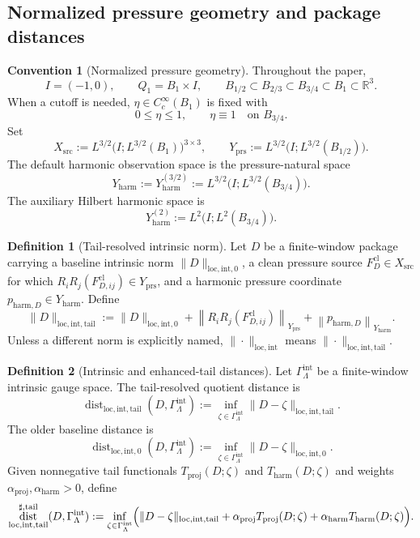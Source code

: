 \documentclass[11pt]{article}
\numberwithin{equation}{section}
\theoremstyle{definition}
\newtheorem{definition}[definition]{Definition}
\newtheorem{convention}[convention]{Convention}
\theoremstyle{remark}
\DeclareMathOperator{\dist}{dist}
\newcommand{\R}{\mathbb{R}}
\newcommand{\loc}{\mathrm{loc}}
\newcommand{\intg}{\mathrm{int}}
\newcommand{\tail}{\mathrm{tail}}
\newcommand{\prs}{\mathrm{prs}}
\newcommand{\proj}{\mathrm{proj}}
\newcommand{\harm}{\mathrm{harm}}
\newcommand{\src}{\mathrm{src}}
\newcommand{\cl}{\mathrm{cl}}
\newcommand{\norm}[2]{\left\|#1\right\|_{#2}}
\newcommand{\Gammaint}{\Gamma^{\intg}_{\Lambda}}
\begin{document}
\subsection{Normalized pressure geometry and package distances}
\label{sec:geometry}

\begin{convention}[Normalized pressure geometry]\label{conv:normalized-geometry}
Throughout the paper,
\[
        I=(-1,0),\qquad Q_1=B_1\times I,
        \qquad B_{1/2}\subset B_{2/3}\subset B_{3/4}\subset B_1\subset\R^3.
\]
When a cutoff is needed, $\eta\in C_c^\infty(B_1)$ is fixed with
\[
        0\le \eta\le 1,\qquad \eta\equiv 1\quad\text{on }B_{3/4}.
\]
Set
\[
        X_{\src}:=L^{3/2}\bigl(I;L^{3/2}(B_1)\bigr)^{3\times3},
        \qquad
        Y_{\prs}:=L^{3/2}\bigl(I;L^{3/2}(B_{1/2})\bigr).
\]
The default harmonic observation space is the pressure-natural space
\[
        Y_{\harm}:=Y^{(3/2)}_{\harm}
        :=L^{3/2}\bigl(I;L^{3/2}(B_{3/4})\bigr).
\]
The auxiliary Hilbert harmonic space is
\[
        Y^{(2)}_{\harm}:=L^2\bigl(I;L^2(B_{3/4})\bigr).
\]
\end{convention}

\begin{definition}[Tail-resolved intrinsic norm]\label{def:tail-resolved-norm}
Let $D$ be a finite-window package carrying a baseline intrinsic norm
$\|D\|_{\loc,\intg,0}$, a clean pressure source $F^{\cl}_{D}\in X_{\src}$ for which
$R_iR_j(F^{\cl}_{D,ij})\in Y_{\prs}$, and a harmonic pressure coordinate
$p_{\harm,D}\in Y_{\harm}$.  Define
\begin{equation}\label{eq:tail-resolved-norm}
\|D\|_{\loc,\intg,\tail}
:=
\|D\|_{\loc,\intg,0}
+
\norm{R_iR_j(F^{\cl}_{D,ij})}{Y_{\prs}}
+
\norm{p_{\harm,D}}{Y_{\harm}}.
\end{equation}
Unless a different norm is explicitly named, $\|\cdot\|_{\loc,\intg}$ means
$\|\cdot\|_{\loc,\intg,\tail}$.
\end{definition}

\begin{definition}[Intrinsic and enhanced-tail distances]\label{def:distances}
Let $\Gammaint$ be a finite-window intrinsic gauge space.  The tail-resolved quotient
distance is
\[
\dist_{\loc,\intg,\tail}(D,\Gammaint)
:=
\inf_{\zeta\in\Gammaint}\|D-\zeta\|_{\loc,\intg,\tail}.
\]
The older baseline distance is
\[
\dist_{\loc,\intg,0}(D,\Gammaint)
:=
\inf_{\zeta\in\Gammaint}\|D-\zeta\|_{\loc,\intg,0}.
\]
Given nonnegative tail functionals $T_{\proj}(D;\zeta)$ and $T_{\harm}(D;\zeta)$ and
weights $\alpha_{\proj},\alpha_{\harm}>0$, define
\begin{equation}\label{eq:enhanced-tail-distance}
\dist^{\sharp,\tail}_{\loc,\intg,\tail}(D,\Gammaint)
:=
\inf_{\zeta\in\Gammaint}
\Bigl(
\|D-\zeta\|_{\loc,\intg,\tail}
+\alpha_{\proj}T_{\proj}(D;\zeta)
+\alpha_{\harm}T_{\harm}(D;\zeta)
\Bigr).
\end{equation}
\end{definition}
\end{document}

